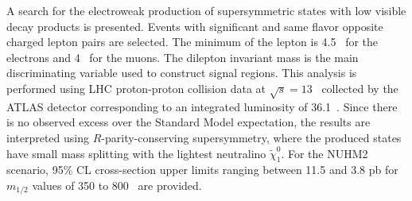 A search for the electroweak production of supersymmetric states with low \pt visible decay products is presented.
Events with significant \met and same flavor opposite charged lepton pairs are selected.
The minimum \pt of the lepton is 4.5~{\GeV} for the electrons and 4~{\GeV} for the muons.
The dilepton invariant mass is the main discriminating variable used to construct signal regions.
This analysis is performed using LHC proton-proton collision data at $\sqrt{s} = 13$~{\TeV} collected by the ATLAS detector corresponding to an integrated luminosity of 36.1~\ifb.
Since there is no observed excess over the Standard Model expectation, the results are interpreted using $R$-parity-conserving supersymmetry, where the produced states have small mass splitting with the lightest neutralino $\widetilde{\chi}^{0}_{1}$.
For the NUHM2 scenario, 95\% CL cross-section upper limits ranging between 11.5 and 3.8 pb for $m_{1/2}$ values of 350 to 800~{\GeV} are provided.
